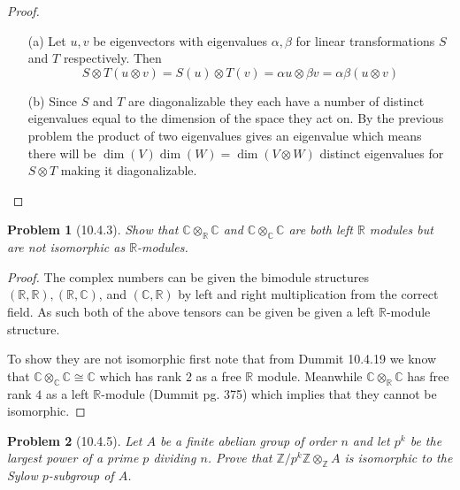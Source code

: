 \documentclass[10pt]{article}
\newcommand{\sk}{\vskip 10mm}
\newcommand{\bb}[1]{\mathbb{#1}}
\theoremstyle{plain}
\newtheorem{problem}{Problem}
\theoremstyle{remark}
\begin{document}
\begin{proof}
  \begin{enumerate}
  \item[(a)] Let $u,v$ be eigenvectors with eigenvalues $\alpha,\beta$ for linear
    transformations $S$ and $T$ respectively. Then
    \[
      S\otimes T(u\otimes v) = S(u)\otimes T(v)= \alpha u\otimes \beta v = \alpha\beta (u\otimes v)
    \]
  \item[(b)] Since $S$ and $T$ are diagonalizable they each have a number
    of distinct eigenvalues equal to the dimension of the space they act on.
    By the previous problem the product of two eigenvalues gives an eigenvalue
    which means there will be $\dim(V)\dim(W)=\dim(V\otimes W)$ distinct eigenvalues
    for $S\otimes T$ making it diagonalizable.
  \end{enumerate}
\end{proof}

\sk

\begin{problem}[10.4.3]
  Show that $\bb{C}\otimes_{\bb{R}}\bb{C}$ and $\bb{C}\otimes_{\bb{C}}\bb{C}$
  are both left $\bb{R}$ modules but are not isomorphic as $\bb{R}$-modules.
\end{problem}

\begin{proof}
  The complex numbers can be given the bimodule structures
  $(\bb{R},\bb{R}),(\bb{R},\bb{C})$, and $(\bb{C},\bb{R})$ by left
  and right multiplication from the correct field. As such both of the
  above tensors can be given be given a left $\bb{R}$-module structure.

  To show they are not isomorphic first note that from Dummit  10.4.19
  we know that $\bb{C}\otimes_{\bb{C}}\bb{C}\cong\bb{C}$ which has rank $2$ as
  a free $\bb{R}$ module. Meanwhile $\bb{C}\otimes_{\bb{R}}\bb{C}$ has free
  rank $4$ as a left $\bb{R}$-module (Dummit pg. 375) which implies that they cannot
  be isomorphic.
\end{proof}

\sk

\begin{problem}[10.4.5]
  Let $A$ be a finite abelian group of order $n$ and let $p^k$ be the largest
  power of a prime $p$ dividing $n$. Prove that
  $\bb{Z}/p^k\bb{Z}\otimes_{\bb{Z}}A$ is isomorphic to the Sylow $p$-subgroup
  of $A$.
\end{problem}
\end{document}
